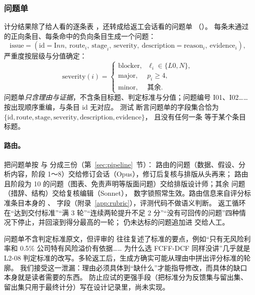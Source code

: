 \subsubsection{问题单}

计分结果除了给人看的逐条表 ，还转成给返工会话看的问题单 （）。
每条未通过的正向条目、每条命中的负向条目生成一个问题：
\[
\text{issue}=(\text{id}=\text{I}nn,\ \text{route}_i,\ \text{stage}_i,\ \text{severity},\ \text{description}=\text{reason}_i,\ \text{evidence}_i),
\]
严重度按层级与分值确定：
\begin{equation}
\label{eq:eval-severity}
\text{severity}(i)=\begin{cases}
\text{blocker}, & \ell_i\in\{L0,N\},\\
\text{major}, & p_i\ge 4,\\
\text{minor}, & \text{其余}.
\end{cases}
\end{equation}
问题单\emph{只含理由与证据}，不含条目标题、判定标准与分值；问题编号 I01、I02…… 按出现顺序重编，与条目 id 无对应。
测试  断言问题单的字段集合恰为 $\{\text{id},\text{route},\text{stage},\text{severity},\text{description},\text{evidence}\}$，
且没有任何一条  等于某个条目标题。

\paragraph{路由。}
 把问题单按  与  分成三份（第~\ref{sec:pipeline}~节）：
 路由的问题（数据、假设、分析内容，阶段 1～8）交给修订会话（Opus），修订后复核与排版从头再来；
 路由且阶段为 10 的问题（图表、免责声明等版面问题）交给排版设计师；其余  问题（措辞、结构）交给复核编辑（Sonnet），
数字锁照常生效。路由信息来自评分标准条目本身的 、 字段（附录~\ref{app:rubric}），评测代码不做语义判断。
返工循环在“达到交付标准”“满 3 轮”“连续两轮提升不足 2 分”“没有可回传的问题”四种情况下停止，并回滚到得分最高的一轮；
仍未达标的问题追加进  交给人工。

\begin{failcase}[：问题单的理由里带着标准的影子]
问题单不含判定标准原文，但评审的  往往复述了标准的要点，例如“只有无风险利率和 0.5\% 公司特有风险溢价有依据……
为什么选 FCFF-DCF 同样没讲”几乎就是 L2-08 判定标准的改写。多轮返工后，生成方确实可能从理由中拼出评分标准的轮廓。
我们接受这一泄漏：理由必须具体到“缺什么”才能指导修改，而具体的缺口本身就是读者需要的东西。
防止应试的更强手段（把标准分为反馈集与留出集、留出集只用于最终计分）写在设计记录里，尚未实现。
\end{failcase}

